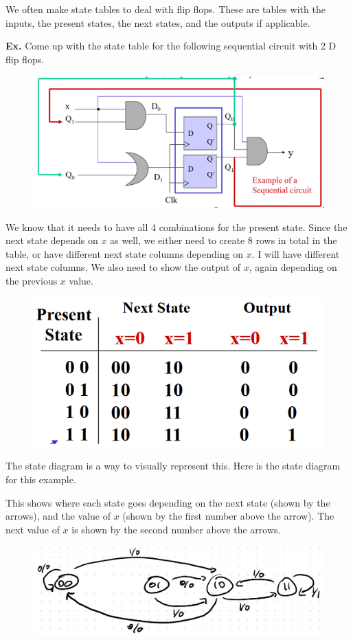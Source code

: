 \documentclass[12pt,letterpaper]{article} \usepackage{amsmath} \usepackage{graphicx}  \usepackage{longtable}  \usepackage{amssymb}
\begin{document}
        We often make state tables to deal with flip flops. These are tables with the inputs, the present states, the next states, and the outputs if applicable. 

        \begin{mdframed}
            \textbf{Ex. } Come up with the state table for the following sequential circuit with 2 D flip flops. 
            \begin{figure}[H]
                \centering
                \includegraphics[width=0.5\linewidth]{f1.png}
            \end{figure}

            We know that it needs to have all 4 combinations for the present state. Since the next state depends on $x$ as well, we either need to create 8 rows in total in the table, or have different next state columns depending on $x$. I will have different next state columns. We also need to show the output of $x$, again depending on the previous $x$ value. 
            \begin{figure}[H]
                \centering
                \includegraphics[width=0.3\linewidth]{f2.png}
            \end{figure}

            The state diagram is a way to visually represent this. Here is the state diagram for this example. 

            This shows where each state goes depending on the next state (shown by the arrows), and the value of $x$ (shown by the first number above the arrow). The next value of $x$ is shown by the second number above the arrows. 
            \begin{figure}[H]
                \centering
                \includegraphics[width=0.6\linewidth]{f3.png}
            \end{figure}
        \end{mdframed}
        
\end{document}
